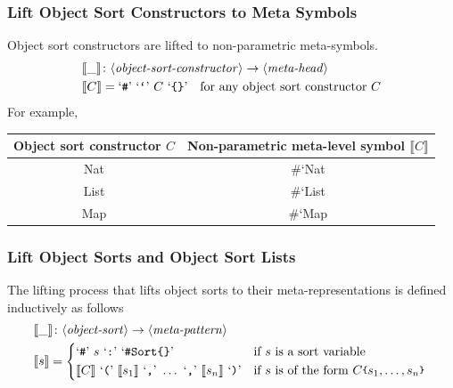 \documentclass[UTF8,11pt]{article}
\theoremstyle{plain}
\theoremstyle{definition}
\theoremstyle{remark}
\newcommand{\parametric}[2]{{#1}\raisebox{.2ex}{\texttt{\footnotesize{\{}}}#2\raisebox{.2ex}{\texttt{\footnotesize{\}}}}}
\newcommand{\denote}[1]{\llbracket{#1}\rrbracket}
\newcommand{\sharpsymbol}{\#}
\newcommand{\KSort}{\texttt{\sharpsymbol Sort}}
\newcommand{\quottt}[1]{\textrm{\lq\texttt{#1}\rq}}
\newcommand{\syntacc}[1]{\text{$\langle$\textit{#1}$\rangle$}}
\begin{document}
%
\subsubsection{Lift Object Sort Constructors to Meta Symbols}
Object sort constructors are lifted to non-parametric meta-symbols.
\begin{align*}
& \denote{\_} \colon \syntacc{object-sort-constructor} \to \syntacc{meta-head}
\\
& \denote{C} = \quottt{\sharpsymbol} \ \quottt{`} \ C \ \quottt{\{\}}
\quad
\text{for any object sort constructor $C$}
\end{align*}
For example,
\begin{center}{\ttfamily
\begin{tabular}{c|c}
    \textrm{Object sort constructor $C$} &
    \textrm{Non-parametric meta-level symbol $\denote{C}$}
    \\\hline
    Nat & \parametric{\sharpsymbol `Nat}{}
    \\\hline
    List & \parametric{\sharpsymbol `List}{}
    \\\hline
    Map & \parametric{\sharpsymbol `Map}{}
\end{tabular}
}
\end{center}

\subsubsection{Lift Object Sorts and Object Sort Lists}
The lifting process that lifts object sorts to their meta-representations
is defined inductively as follows
\begin{align*}
&\denote{\_} \colon \syntacc{object-sort} \to \syntacc{meta-pattern} \\
&\denote{s} = \begin{cases*}
\quottt{\sharpsymbol} \ s \ \quottt{:} \ \quottt{\KSort\{\}} & if $s$ is a 
sort variable \\
\denote{C} \ \quottt{(} \ 
\denote{s_1} \ \quottt{,} \ 
\dots \ \quottt{,} \ 
\denote{s_n} \ \quottt{)} & if $s$ 
is of the 
form $\parametric{C}{s_1,\dots,s_n}$
\end{cases*}
\end{align*}
\end{document}
